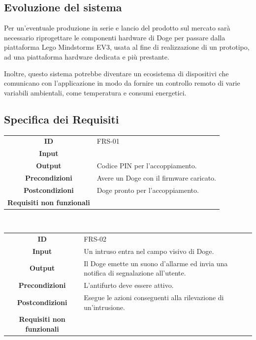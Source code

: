 \documentclass{article}
\begin{document}
\subsection{Evoluzione del sistema}

Per un'eventuale produzione in serie e lancio del prodotto sul mercato sarà necessario riprogettare le componenti hardware di Doge per passare dalla piattaforma Lego Mindstorms EV3, usata al fine di realizzazione di un prototipo, ad una piattaforma hardware dedicata e più prestante.

Inoltre, questo sistema potrebbe diventare un ecosistema di dispositivi che comunicano con l'applicazione in modo da fornire un controllo remoto di varie variabili ambientali, come temperatura e consumi energetici.

\subsection{Specifica dei Requisiti}

\begin{adjustbox}{center}
\begin{tabular}{|c|p{10cm}|}
\hline
\textbf{ID} & FRS-01\\
\textbf{Input} &\\
\textbf{Output} & Codice PIN per l'accoppiamento.\\
\textbf{Precondizioni} & Avere un Doge con il firmware caricato.\\
\textbf{Postcondizioni} & Doge pronto per l'accoppiamento.\\
\textbf{Requisiti non funzionali} &\\
\hline
\end{tabular}
\end{adjustbox}

~

\begin{adjustbox}{center}
\begin{tabular}{|c|p{10cm}|}
\hline
\textbf{ID} & FRS-02 \\
\textbf{Input} & Un intruso entra nel campo visivo di Doge. \\
\textbf{Output} & Il Doge emette un suono d'allarme ed invia una notifica di segnalazione all'utente. \\
\textbf{Precondizioni} & L'antifurto deve essere attivo. \\
\textbf{Postcondizioni} & Esegue le azioni conseguenti alla rilevazione di un'intrusione. \\
\textbf{Requisiti non funzionali} &  \\
\hline
\end{tabular}
\end{adjustbox}
\end{document}
